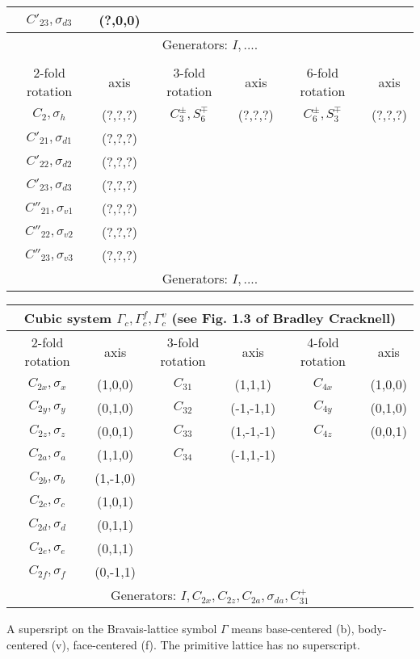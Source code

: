 \documentclass[11pt,a4paper]{report}
\begin{document}
\begin{center}
\begin{tabular}{||c|c|||c|c||c|c||}
$C'_{23},\sigma_{d3}$ & (?,0,0)  & &  &   &\\  
\hline
\multicolumn{6}{|c|}{Generators: $I, .... $}\\
\hline
\noalign{\medskip}
%
\hline
\multicolumn{6}{|c|}{Hexagonal system $\Gamma_h$}\\
\hline
2-fold rotation & axis & 3-fold rotation &axis &6-fold rotation  & axis\\
\hline
$C_{2},\sigma_h$ & (?,?,?)  & $C^\pm_3,S^{\mp}_6$ & (?,?,?)  & $C^{\pm}_6,S^{\mp}_3$  & (?,?,?)\\  
$C'_{21},\sigma_{d1}$ & (?,?,?)  &  &  &   &\\  
$C'_{22},\sigma_{d2}$ & (?,?,?)  &  &  &   &\\  
$C'_{23},\sigma_{d3}$ & (?,?,?)  &  &  &   &\\  
$C''_{21},\sigma_{v1}$ & (?,?,?)  &  &  &   &\\  
$C''_{22},\sigma_{v2}$ & (?,?,?)  &  &  &   &\\  
$C''_{23},\sigma_{v3}$ & (?,?,?)  &  &  &   &\\  
\hline
\multicolumn{6}{|c|}{Generators: $I, .... $}\\
\hline
\end{tabular}
\end{center}
\begin{center}
\begin{tabular}{||c|c|||c|c||c|c||}
\hline
\multicolumn{6}{|c|}{Cubic system $\Gamma_c,\Gamma_c^f,\Gamma_c^v$
(see Fig. 1.3 of Bradley Cracknell\cite{bradley72_book})}\\
\hline
2-fold rotation & axis & 3-fold rotation & axis &4-fold rotation & axis \\
\hline
$C_{2x},\sigma_x$ & (1,0,0)  & $C_{31}$ & (1,1,1)  &   $C_{4x}$ & (1,0,0)\\  
$C_{2y},\sigma_y$ & (0,1,0)  & $C_{32}$ & (-1,-1,1)&   $C_{4y}$ & (0,1,0)\\  
$C_{2z},\sigma_z$ & (0,0,1)  & $C_{33}$ & (1,-1,-1)&   $C_{4z}$ & (0,0,1)\\  
$C_{2a},\sigma_a$ & (1,1,0)  & $C_{34}$ & (-1,1,-1)&           &\\  
$C_{2b},\sigma_b$ & (1,-1,0) &         &    & &\\
$C_{2c},\sigma_c$ & (1,0,1)  &         &  & &\\
$C_{2d},\sigma_d$ & (0,1,1)  &         &  & &\\
$C_{2e},\sigma_e$ & (0,1,1)  &         &  & &\\
$C_{2f},\sigma_f$ & (0,-1,1) &         &  & &\\
\hline
\multicolumn{6}{|c|}{Generators: $I, C_{2x}, C_{2z}, C_{2a}, \sigma_{da}, C^+_{31}$}\\
\hline
\end{tabular}
\end{center}
A supersript on the Bravais-lattice symbol $\Gamma$ means
base-centered (b), body-centered (v), face-centered (f). The primitive
lattice has no superscript.
\end{document}

